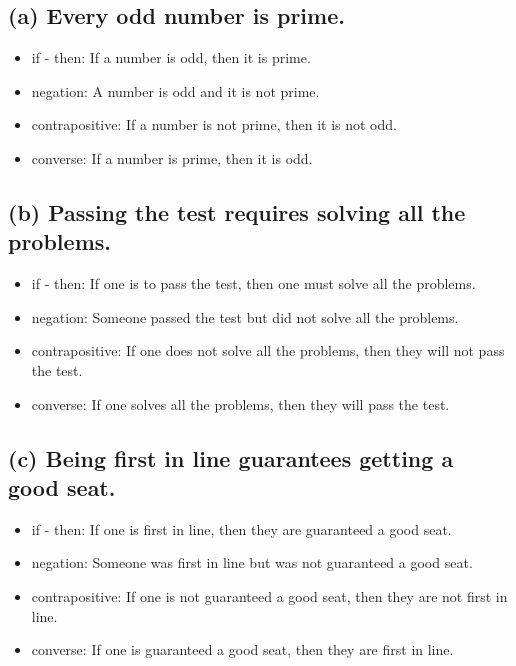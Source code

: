 \documentclass[
]{article}
\providecommand{\tightlist}{%
  \setlength{\itemsep}{0pt}\setlength{\parskip}{0pt}}
\begin{document}
\hypertarget{a-every-odd-number-is-prime.}{%
\subsection{(a) Every odd number is
prime.}\label{a-every-odd-number-is-prime.}}

\begin{itemize}
\tightlist
\item
  if - then: If a number is odd, then it is prime.\\
\item
  negation: A number is odd and it is not prime.\\
\item
  contrapositive: If a number is not prime, then it is not odd.\\
\item
  converse: If a number is prime, then it is odd.
\end{itemize}

\hypertarget{b-passing-the-test-requires-solving-all-the-problems.}{%
\subsection{(b) Passing the test requires solving all the
problems.}\label{b-passing-the-test-requires-solving-all-the-problems.}}

\begin{itemize}
\tightlist
\item
  if - then: If one is to pass the test, then one must solve all the
  problems.\\
\item
  negation: Someone passed the test but did not solve all the
  problems.\\
\item
  contrapositive: If one does not solve all the problems, then they will
  not pass the test.\\
\item
  converse: If one solves all the problems, then they will pass the
  test.
\end{itemize}

\hypertarget{c-being-first-in-line-guarantees-getting-a-good-seat.}{%
\subsection{(c) Being first in line guarantees getting a good
seat.}\label{c-being-first-in-line-guarantees-getting-a-good-seat.}}

\begin{itemize}
\tightlist
\item
  if - then: If one is first in line, then they are guaranteed a good
  seat.\\
\item
  negation: Someone was first in line but was not guaranteed a good
  seat.\\
\item
  contrapositive: If one is not guaranteed a good seat, then they are
  not first in line.\\
\item
  converse: If one is guaranteed a good seat, then they are first in
  line.
\end{itemize}
\end{document}
